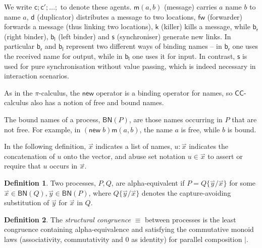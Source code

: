 \documentclass[submission,copyright,creativecommons]{eptcs}
\newcommand{\new}{\mathsf{new}}
\newcommand{\pic}{$\pi$-calculus}
\newcommand{\ccomb}{$\mathsf{CC}$-calculus}
\newcommand{\pzero}{\mathbin{0}}
\newcommand{\freenames}[1]{\mathbin{\mathsf{FN}(#1)}}
\newcommand{\boundnames}[1]{\mathbin{\mathsf{BN}(#1)}}
\newcommand{\vect}[1]{\stackrel{\rightharpoonup}{#1}}
\theoremstyle{definition}
\newtheorem{definition}{Definition}
\theoremstyle{remark}
\theoremstyle{remark}
\begin{document}
We write $\mathsf{c};\mathsf{c'};\ldots;$ to denote these
agents. $\mathsf{m}(a,b)$ (message) carries $a$ name $b$ to name $a$,
$\mathsf{d}$ (duplicator) distributes a message to two locations,
$\mathsf{fw}$ (forwarder) forwards a message (thus linking two
locations), $\mathsf{k}$ (killer) kills a message, while
$\mathsf{b}_{\mathsf{r}}$ (right binder), $\mathsf{b}_{\mathsf{l}}$
(left binder) and $\mathsf{s}$ (synchroniser) generate new links. In
particular $\mathsf{b}_{\mathsf{r}}$ and $\mathsf{b}_{\mathsf{l}}$
represent two different ways of binding names – in
$\mathsf{b}_{\mathsf{r}}$ one uses the received name for output, while
in $\mathsf{b}_{\mathsf{l}}$ one uses it for input. In contrast,
$\mathsf{s}$ is used for pure synchronisation without value passing,
which is indeed necessary in interaction scenarios.

As in the {\pic}, the $\new$ operator is a binding operator
for names, so {\ccomb} also has a notion of free and bound names.


The bound names of a process, $\boundnames{P}$, are those names occurring in $P$
that are not free. For example, in $(\new\; b)\mathsf{m}(a,b)$, the name $a$ is free, while $b$ is bound.

In the following definition, $\vect{x}$ indicates a list of names,
$u:\vect{x}$ indicates the concatenation of $u$ onto the vector, and
abuse set notation $u \in \vect{x}$ to assert or require that $u$
occurs in $\vect{x}$.

\begin{definition}
Two processes, $P,Q$, are alpha-equivalent if $P = Q\{\vect{y}/\vect{x}\}$ for
some $\vect{x} \in \boundnames{Q},\vect{y} \in \boundnames{P}$, where $Q\{\vect{y}/\vect{x}\}$
denotes the capture-avoiding substitution of $\vect{y}$ for $\vect{x}$ in $Q$.
\end{definition}

\begin{definition}
  The {\em structural congruence} $\equiv$
  between processes \cite{SangiorgiWalker} is the least congruence containing
  alpha-equivalence and satisfying the commutative monoid laws
  (associativity, commutativity and $\pzero$ as identity) for parallel
  composition $|$.
\end{definition}
\end{document}
